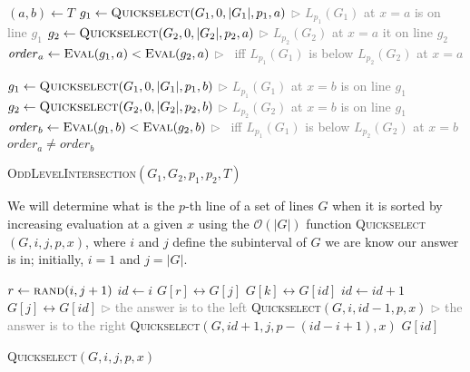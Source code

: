 \documentclass{article}
\def\bigo{\mathcal{O}}
\begin{document}
\begin{algorithm}
\begin{algorithmic}[1]
 \State $(a,b) \gets T$
\State $g_1 \gets \textsc{Quickselect}(G_1,0,|G_1|,p_1,a)$
\hfill {\small \textcolor{gray}{$\rhd$ $L_{p_1}(G_1)$ at $x = a$ is on line $g_1$}}
\State $g_2 \gets \textsc{Quickselect}(G_2,0,|G_2|,p_2,a)$
\hfill {\small \textcolor{gray}{$\rhd$ $L_{p_2}(G_2)$ at $x = a$ it on line $g_2$}}
\State $\mathit{order}_a \gets \textsc{Eval}(g_1, a) < \textsc{Eval}(g_2, a)$
\hfill {\small \textcolor{gray}{$\rhd$ \true\ iff $L_{p_1}(G_1)$ is below $L_{p_2}(G_2)$ at $x = a$}}

\State $g_1 \gets \textsc{Quickselect}(G_1,0,|G_1|,p_1,b)$
\hfill {\small \textcolor{gray}{$\rhd$ $L_{p_1}(G_1)$ at $x = b$ is on line $g_1$}}
\State $g_2 \gets \textsc{Quickselect}(G_2,0,|G_2|,p_2,b)$
\hfill {\small \textcolor{gray}{$\rhd$ $L_{p_2}(G_2)$ at $x = b$ is on line $g_1$}}
\State $\mathit{order}_b \gets \textsc{Eval}(g_1, b) < \textsc{Eval}(g_2, b)$
\hfill {\small \textcolor{gray}{$\rhd$ \true\ iff $L_{p_1}(G_1)$ is below $L_{p_2}(G_2)$ at $x = b$}}
\State \Return $\mathit{order}_a \neq \mathit{order}_b$
\end{algorithmic}
\caption{\textsc{OddLevelIntersection}$(G_1,G_2,p_1,p_2,T)$}
\label{odd_level_intersection_algorithm}
\end{algorithm}

We will determine what is the $p$-th line of a set of lines $G$ when it is sorted by increasing evaluation at a given $x$ using the $\bigo(|G|)$ function \textsc{Quickselect}$(G,i,j,p,x)$, where $i$ and $j$ define the subinterval of $G$ we are know our answer is in; initially, $i=1$ and $j=|G|$.

\begin{algorithm}
\begin{algorithmic}[1]

\State $r \gets \textsc{rand}(i,j+1)$
\State $id \gets i$
\State $G[r] \leftrightarrow G[j]$
    \State $G[k] \leftrightarrow G[id]$
    \State $id\gets id+1$
    \EndIf
\EndFor
\State $G[j]  \leftrightarrow G[id]$
 \hfill {\small \textcolor{gray}{$\rhd$ the answer is to the left}}
\State \Return \textsc{Quickselect}$(G, i,id-1,p,x)$
\EndIf
{} \hfill {\small \textcolor{gray}{$\rhd$ the answer is to the right}}
\State \Return \textsc{Quickselect}$(G,id+1,j,p-(id-i+1),x)$
\EndIf
\State \Return $G[id]$
\end{algorithmic}
\caption{\textsc{Quickselect}$(G,i,j,p,x)$}
\label{quickselect_algorithm}
\end{algorithm}
\end{document}
